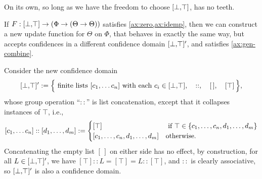 \begin{subappendices}
    On its own, so long as we have the freedom to choose $[\bot,\!\top]$,  has no teeth.


    \begin{prop} \label{prop:free-additivity}
    	If $F: [\bot,\!\top] \to (\Phi \to (\Theta \to \Theta))$ satisfies \cref{ax:zero,ax:idemp}, then we can construct a new update
    	function for $\Theta$ on $\Phi$, that behaves in exactly the same way, but accepts confidences in a different confidence domain $[\bot,\!\top]'$, and satisfies \cref{ax:gen-combine}.
    \end{prop}
    \begin{lproof}
    Consider the new confidence domain
    $$
    	[\bot,\!\top]' := \Big\{ \text{ finite lists } [c_1, \ldots c_n]
    		\text{ with each } c_i \in [\bot,\!\top],
    		\quad
    		::,
    		\quad
    		[\,],
    		\quad
    		[\top]
    		\,
    	\Big\},
    $$
    whose group operation ``$::$'' is list concatenation, except that it collapses instances of $\top$, i.e.,
    \[
    	[c_1, \ldots c_n] :: [d_1, \ldots, d_m]
    	 := \begin{cases} \relax
    		 [\top] & \text{ if } \top \in \{c_1, \ldots, c_n,d_1, \ldots,d_m \} \\
    		 [c_1, \ldots, c_{n}, d_1, \ldots, d_m] & \text{otherwise.}
     \end{cases}
    \]
    Concatenating the empty list $[\,]$ on either side has no effect,
    by construction, for all $L \in [\bot,\!\top]'$, we have $[\top] :: L = [\top] = L :: [\top]$,
    and $::$ is clearly associative, so $[\bot,\!\top]'$ is also a confidence domain.


\end{lproof}
\end{subappendices}
